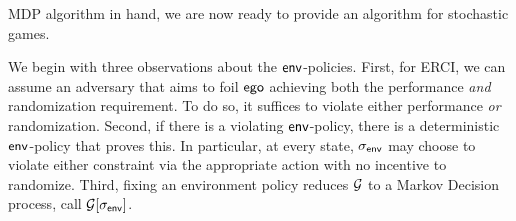 
MDP algorithm in hand, we are now ready to provide an algorithm for
stochastic games.


 We begin with three observations about
the $\mathsf{env}$-policies.  First, for ERCI, we can assume an adversary
that aims to foil $\mathsf{ego}$ achieving both the performance \emph{and}
randomization requirement.  To do so, it suffices to violate either
performance \emph{or} randomization.  Second, if there is a violating
$\mathsf{env}$-policy, there is a deterministic $\mathsf{env}$-policy that proves
this.  In particular, at every state, ${\sigma_{\mathsf{env}}}$ may choose to
violate either constraint via the appropriate action with no incentive
to randomize. Third, fixing an environment policy reduces $\mathcal{G}$ to a
Markov Decision process, call $\mathcal{G}[{\sigma_{\mathsf{env}}}]$.

